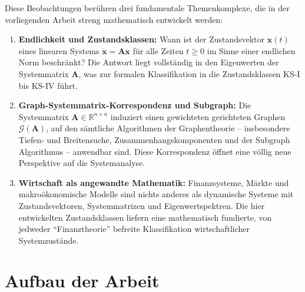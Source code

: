﻿\documentclass[12pt, a4paper, titlepage]{report}
\theoremstyle{definition}
\theoremstyle{remark}
\newcommand{\R}{\mathbb{R}}
\newcommand{\vx}{\bm{x}}
\newcommand{\vA}{\bm{A}}
\begin{document}
Diese Beobachtungen berühren drei fundamentale Themenkomplexe, die in der vorliegenden
Arbeit streng mathematisch entwickelt werden:

\begin{enumerate}[label=(\roman*)]
  \item \textbf{Endlichkeit und Zustandsklassen:} Wann ist der Zustandsvektor
    $\vx(t)$ eines linearen Systems $\dot{\vx} = \vA\vx$ für alle Zeiten $t \geq 0$
    im Sinne einer endlichen Norm beschränkt? Die Antwort liegt vollständig in den
    Eigenwerten der Systemmatrix $\vA$, was zur formalen Klassifikation in die
    Zustandsklassen KS-I bis KS-IV führt.

  \item \textbf{Graph-Systemmatrix-Korrespondenz und Subgraph:} Die Systemmatrix
    $\vA \in \R^{n \times n}$ induziert einen gewichteten gerichteten Graphen
    $\mathcal{G}(\vA)$, auf den sämtliche Algorithmen der Graphentheorie -- insbesondere
    Tiefen- und Breitensuche, Zusammenhangskomponenten und der Subgraph Algorithmus --
    anwendbar sind. Diese Korrespondenz öffnet eine völlig neue Perspektive auf die
    Systemanalyse.

  \item \textbf{Wirtschaft als angewandte Mathematik:} Finanzsysteme, Märkte und
    makroökonomische Modelle sind nichts anderes als dynamische Systeme mit
    Zustandsvektoren, Systemmatrizen und Eigenwertspektren. Die hier entwickelten
    Zustandsklassen liefern eine mathematisch fundierte, von jedweder
    ``Finanztheorie'' befreite Klassifikation wirtschaftlicher Systemzustände.
\end{enumerate}

\section{Aufbau der Arbeit}
\end{document}
